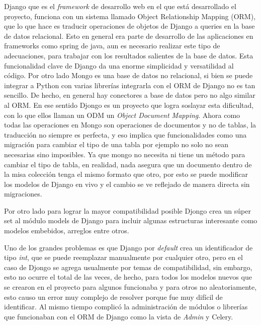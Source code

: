    \par \gls{Django} que es el \textit{framework} de desarrollo web en el que está desarrollado el proyecto, funciona con un sistema llamado Object Relationship Mapping (\gls{ORM}), que lo que hace es traducir operaciones de objetos de \gls{Django} a queries en la base de datos relacional. Esto en general era parte de desarrollo de las aplicaciones en frameworks como spring de java, aun es necesario realizar este tipo de adecuaciones, para trabajar con los resultados salientes de la base de datos. Esta funcionalidad clave de \gls{Django} da una enorme simplicidad y versatilidad al código. Por otro lado Mongo es una base de datos no relacional, si bien se puede integrar a Python con varias librerías integrarla con el \gls{ORM} de \gls{Django} no es tan sencillo. De hecho, en general hay conectores a base de datos pero no algo similar al \gls{ORM}. En ese sentido \gls{Djongo} es un proyecto que logra soslayar esta dificultad, con lo que ellos llaman un \gls{ODM} un \textit{Object Document Mapping}. Ahora como todas las operaciones en Mongo son operaciones de documentos y no de tablas, la traducción no siempre es perfecta, y eso implica que funcionalidades como una migración para cambiar el tipo de una tabla por ejemplo no solo no sean necesarias sino imposibles. Ya que mongo no necesita ni tiene un método para cambiar el tipo de tabla, en realidad, nada asegura que un documento dentro de la misa colección tenga el mismo formato que otro, por esto se puede modificar los modelos de \gls{Django} en vivo y el cambio se ve reflejado de manera directa sin migraciones.
    
    \par Por otro lado para lograr la mayor compatibilidad posible \gls{Djongo} crea un súper set al módulo models de \gls{Django} para incluir algunas estructuras interesante como modelos embebidos, arreglos entre otros.

    \par Uno de los grandes problemas es que \gls{Django} por \textit{default} crea un identificador de tipo \textit{int}, que se puede reemplazar manualmente por cualquier otro, pero en el caso de \gls{Djongo} se agrega usualmente por temas de compatibilidad, sin embargo, esto no ocurre el total de las veces, de hecho, para todos los modelos nuevos que se crearon en el proyecto para algunos funcionaba y para otros no aleatoriamente, esto causo un error muy complejo de resolver porque fue muy difícil de identificar. Al mismo tiempo complicó la administración de módulos o librerías que funcionaban con el \acrshort{ORM} de \gls{Django} como la vista de \textit{Admin} y \gls{Celery}.

